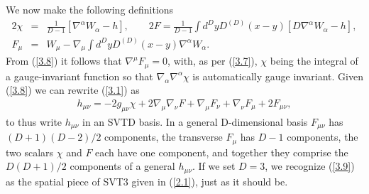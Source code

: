 We now make the following definitions
%
\begin{eqnarray}
2\chi&=&\frac{1}{D-1}[\nabla^{\alpha}W_{\alpha}-h],\quad 
\quad 2F=\frac{1}{D-1}\int d^DyD^{(D)}(x-y)[D\nabla^{\alpha}W_{\alpha}-h],
\nonumber\\
F_{\mu}&=&W_{\mu}-\nabla_{\mu}\int d^DyD^{(D)}(x-y)\nabla^{\alpha}W_{\alpha}.
\label{3.8}
\end{eqnarray}
%
From (\ref{3.8})  it follows that  $\nabla^{\mu}F_{\mu}=0$, with, as per (\ref{3.7}),  $\chi$ being the integral of a gauge-invariant function so that $\nabla_{\alpha}\nabla^{\alpha}\chi$ is automatically gauge invariant. Given (\ref{3.8}) we can rewrite (\ref{3.1}) as 
%
\begin{eqnarray}
h_{\mu\nu}=-2g_{\mu\nu}\chi+2\nabla_{\mu}\nabla_{\nu}F
+ \nabla_{\mu}F_{\nu}+\nabla_{\nu}F_{\mu}+2F_{\mu\nu},
\label{3.9}
\end{eqnarray}
%
to thus write $h_{\mu\nu}$ in an SVTD  basis. In a general D-dimensional basis $F_{\mu\nu}$ has $(D+1)(D-2)/2$ components, the transverse $F_{\mu}$ has $D-1$ components, the two scalars $\chi$ and $F$ each have one component, and together they comprise the $D(D+1)/2$ components of a general $h_{\mu\nu}$. If we set $D=3$, we recognize (\ref{3.9}) as the spatial piece of SVT3 given in (\ref{2.1}), just as it should be.

